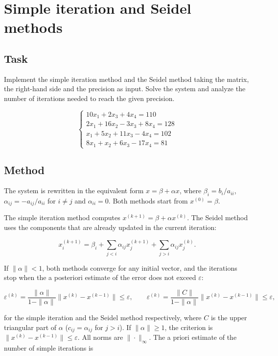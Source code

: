 \section{Simple iteration and Seidel methods}

\subsection{Task}

Implement the simple iteration method and the Seidel method taking the matrix, the right-hand side
and the precision as input. Solve the system and analyze the number of iterations needed to reach
the given precision.

\[
\begin{cases}
10x_1 + 2x_3 + 4x_4 = 110 \\
2x_1 + 16x_2 - 3x_3 + 8x_4 = 128 \\
x_1 + 5x_2 + 11x_3 - 4x_4 = 102 \\
8x_1 + x_2 + 6x_3 - 17x_4 = 81
\end{cases}
\]

\subsection{Method}

The system is rewritten in the equivalent form $x = \beta + \alpha x$, where
$\beta_i = b_i / a_{ii}$, $\alpha_{ij} = -a_{ij} / a_{ii}$ for $i \ne j$ and $\alpha_{ii} = 0$.
Both methods start from $x^{(0)} = \beta$.

The simple iteration method computes $x^{(k+1)} = \beta + \alpha x^{(k)}$. The Seidel method uses
the components that are already updated in the current iteration:

\[
x_i^{(k+1)} = \beta_i + \sum_{j<i} \alpha_{ij} x_j^{(k+1)} + \sum_{j>i} \alpha_{ij} x_j^{(k)}.
\]

If $\|\alpha\| < 1$, both methods converge for any initial vector, and the iterations stop when
the a posteriori estimate of the error does not exceed $\varepsilon$:

\[
\varepsilon^{(k)} = \frac{\|\alpha\|}{1 - \|\alpha\|} \|x^{(k)} - x^{(k-1)}\| \le \varepsilon,
\qquad
\varepsilon^{(k)} = \frac{\|C\|}{1 - \|\alpha\|} \|x^{(k)} - x^{(k-1)}\| \le \varepsilon,
\]

for the simple iteration and the Seidel method respectively, where $C$ is the upper triangular
part of $\alpha$ ($c_{ij} = \alpha_{ij}$ for $j > i$). If $\|\alpha\| \ge 1$, the criterion is
$\|x^{(k)} - x^{(k-1)}\| \le \varepsilon$. All norms are $\|\cdot\|_\infty$. The a priori estimate
of the number of simple iterations is

